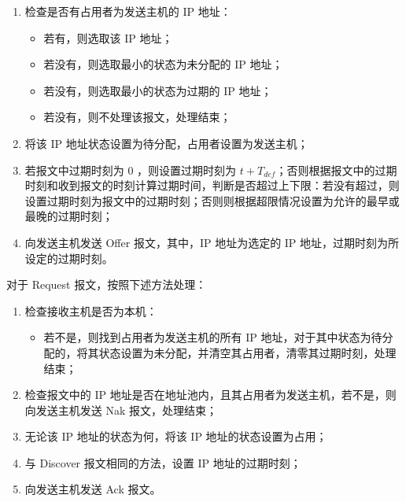 \begin{enumerate}

    \item 检查是否有占用者为发送主机的 IP 地址：\begin{itemize}

              \item 若有，则选取该 IP 地址；

              \item 若没有，则选取最小的状态为未分配的 IP 地址；

              \item 若没有，则选取最小的状态为过期的 IP 地址；

              \item 若没有，则不处理该报文，处理结束；

          \end{itemize}



    \item 将该 IP 地址状态设置为待分配，占用者设置为发送主机；

    \item 若报文中过期时刻为 0 ，则设置过期时刻为 $t + T_{def}$；否则根据报文中的过期时刻和收到报文的时刻计算过期时间，判断是否超过上下限：若没有超过，则设置过期时刻为报文中的过期时刻；否则则根据超限情况设置为允许的最早或最晚的过期时刻；

    \item 向发送主机发送 Offer 报文，其中，IP 地址为选定的 IP 地址，过期时刻为所设定的过期时刻。

\end{enumerate}

对于 Request 报文，按照下述方法处理：

\begin{enumerate}

    \item 检查接收主机是否为本机：\begin{itemize}

              \item 若不是，则找到占用者为发送主机的所有 IP 地址，对于其中状态为待分配的，将其状态设置为未分配，并清空其占用者，清零其过期时刻，处理结束；

          \end{itemize}



    \item 检查报文中的 IP 地址是否在地址池内，且其占用者为发送主机，若不是，则向发送主机发送 Nak 报文，处理结束；

    \item 无论该 IP 地址的状态为何，将该 IP 地址的状态设置为占用；

    \item 与 Discover 报文相同的方法，设置 IP 地址的过期时刻；

    \item 向发送主机发送 Ack 报文。

\end{enumerate}

